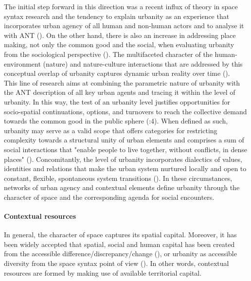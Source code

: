 \documentclass[11pt]{report}
\begin{document}
{{{The initial step forward in this direction was a recent influx of theory in space syntax research and the tendency to explain urbanity as an experience that incorporates urban agency of all human and non-human actors and to analyse it with ANT (\citealt{(Rheintantz 2012)}).
On the other hand, there is also an increase in addressing place making, not only the common good and the social, when evaluating urbanity from the sociological perspective (\href{Holden}{\citealt{holden_justifying_2015}}). 
The multifaceted character of the human-environment (nature) and nature-culture interactions that are addressed by this conceptual overlap of urbanity captures dynamic urban reality over time (\href{Tardin}{\citealt{tardin_landscape_2014}}).
\\

This line of research aims at combining the parametric nature of urbanity with the ANT description of all key urban agents and tracing it within the level of urbanity. In this way, the test of an urbanity level justifies opportunities for socio-spatial continuations, options, and turnovers to reach the collective demand towards the common good in the public sphere (\href{Holden}{\citealt{holden_justifying_2015}}:4). 
When defined as such, urbanity may serve as a valid scope that offers categories for restricting complexity towards a structural unity of urban elements and comprises a sum of social interactions that "enable people  to  live  together,  without  conflicts,  in  dense places"
(\citealt{Bisson 2016}).
Concomitantly, the level of urbanity incorporates dialectics of values, identities and relations that make the urban system nurtured locally and open to constant, flexible, spontaneous system transitions (\href{Groth}{\citealt{groth_reclaiming_2005}}).
In these circumstances, networks of urban agency and contextual elements define urbanity through the character of space and the corresponding agenda for social encounters.

\paragraph{Contextual resources}

In general, the character of space captures its spatial capital. 
Moreover, it has been widely accepted that spatial, social and human capital has been created from the accessible difference/discrepancy/change (\cite{(Becker 1993})\href{Coleman}{\citealt{coleman_social_1988}}, or urbanity as accessible diversity from the space syntax point of view (\href{Marcus}{\citealt{marcus_spatial_2007}}). In other words, contextual resources are formed by making use of available territorial capital.
\\

}}}
\end{document}
